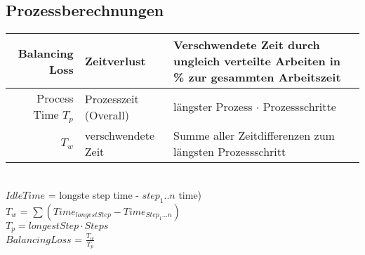 \subsection{Prozessberechnungen}\label{balancingLoss}
\begin{center}
	\begin{tabular}{|r|l|p{7cm}|}
		\hline Balancing Loss  & Zeitverlust & Verschwendete Zeit durch ungleich verteilte Arbeiten in \% zur gesammten Arbeitszeit \\ 
		\hline Process Time $T_p$ & Prozesszeit (Overall) & l\"angster Prozess $\cdot$ Prozessschritte\\ 
		\hline $T_w$ & verschwendete Zeit & Summe aller Zeitdifferenzen zum l\"angsten Prozessschritt\\
		\hline
	\end{tabular}
	\\\vspace{5 mm}
		$Idle Time$ = longste step time - $step_1..n$ time) \\\vspace{2 mm}
	$T_w$ = $ \sum (Time_{longestStep}-Time_{Step_1...n})$ \\\vspace{2 mm}
	$T_p = longest Step \cdot Steps$ \\\vspace{2 mm}
	$Balancing Loss$ = $\frac{T_w}{T_p}$ \\\vspace{2 mm}
	
\end{center}
